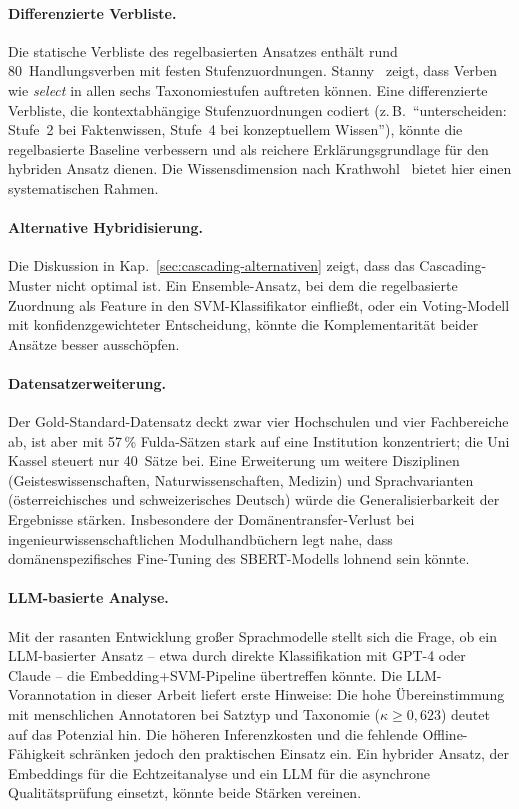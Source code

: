\paragraph{Differenzierte Verbliste.}
Die statische Verbliste des regelbasierten Ansatzes enthält rund 80~Handlungsverben mit festen Stufenzuordnungen.
Stanny~\cite{stanny2016reevaluating} zeigt, dass Verben wie \emph{select} in allen sechs Taxonomiestufen auftreten können.
Eine differenzierte Verbliste, die kontextabhängige Stufenzuordnungen codiert (z.\,B.\ \enquote{unterscheiden: Stufe~2 bei Faktenwissen, Stufe~4 bei konzeptuellem Wissen}), könnte die regelbasierte Baseline verbessern und als reichere Erklärungsgrundlage für den hybriden Ansatz dienen.
Die Wissensdimension nach Krathwohl~\cite{krathwohl2002revision} bietet hier einen systematischen Rahmen.

\paragraph{Alternative Hybridisierung.}
Die Diskussion in Kap.~\ref{sec:cascading-alternativen} zeigt, dass das Cascading-Muster nicht optimal ist.
Ein Ensemble-Ansatz, bei dem die regelbasierte Zuordnung als Feature in den SVM-Klassifikator einfließt, oder ein Voting-Modell mit konfidenzgewichteter Entscheidung, könnte die Komplementarität beider Ansätze besser ausschöpfen.

\paragraph{Datensatzerweiterung.}
Der Gold-Standard-Datensatz deckt zwar vier Hochschulen und vier Fachbereiche ab, ist aber mit 57\,\% Fulda-Sätzen stark auf eine Institution konzentriert; die Uni Kassel steuert nur 40~Sätze bei.
Eine Erweiterung um weitere Disziplinen (Geisteswissenschaften, Naturwissenschaften, Medizin) und Sprachvarianten (österreichisches und schweizerisches Deutsch) würde die Generalisierbarkeit der Ergebnisse stärken.
Insbesondere der Domänentransfer-Verlust bei ingenieurwissenschaftlichen Modulhandbüchern legt nahe, dass domänenspezifisches Fine-Tuning des SBERT-Modells lohnend sein könnte.

\paragraph{LLM-basierte Analyse.}
Mit der rasanten Entwicklung großer Sprachmodelle stellt sich die Frage, ob ein LLM-basierter Ansatz -- etwa durch direkte Klassifikation mit GPT-4 oder Claude -- die Embedding+SVM-Pipeline übertreffen könnte.
Die LLM-Vorannotation in dieser Arbeit liefert erste Hinweise: Die hohe Übereinstimmung mit menschlichen Annotatoren bei Satztyp und Taxonomie ($\kappa \geq 0{,}623$) deutet auf das Potenzial hin.
Die höheren Inferenzkosten und die fehlende Offline-Fähigkeit schränken jedoch den praktischen Einsatz ein.
Ein hybrider Ansatz, der Embeddings für die Echtzeitanalyse und ein LLM für die asynchrone Qualitätsprüfung einsetzt, könnte beide Stärken vereinen.

